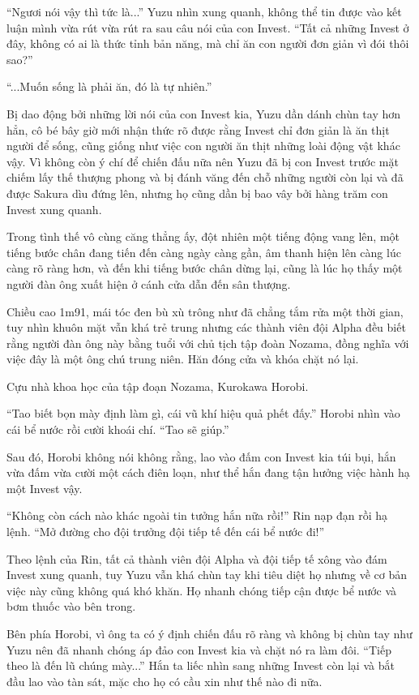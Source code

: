 {``Ngươi nói vậy thì tức là...'' Yuzu nhìn xung quanh, không thể tin được
vào kết luận mình vừa rút vừa rút ra sau câu nói của con Invest. ``Tất
cả những Invest ở đây, không có ai là thức tỉnh bản năng, mà chỉ ăn con
người đơn giản vì đói thôi sao?''

``...Muốn sống là phải ăn, đó là tự nhiên.''

Bị dao động bởi những lời nói của con Invest kia, Yuzu dần dánh chùn tay
hơn hẳn, cô bé bây giờ mới nhận thức rõ được rằng Invest chỉ đơn giản là
ăn thịt người để sống, cũng giống như việc con người ăn thịt những loài
động vật khác vậy. Vì không còn ý chí để chiến đấu nữa nên Yuzu đã bị
con Invest trước mặt chiếm lấy thế thượng phong và bị đánh văng đến chỗ
những người còn lại và đã được Sakura dìu đứng lên, nhưng họ cũng dần bị
bao vây bởi hàng trăm con Invest xung quanh.

Trong tình thế vô cùng căng thẳng ấy, đột nhiên một tiếng động vang lên,
một tiếng bước chân đang tiến đến càng ngày càng gần, âm thanh hiện lên
càng lúc càng rõ ràng hơn, và đến khi tiếng bước chân dừng lại, cũng là
lúc họ thấy một người đàn ông xuất hiện ở cánh cửa dẫn đến sân thượng.

Chiều cao 1m91, mái tóc đen bù xù trông như đã chẳng tắm rửa một thời
gian, tuy nhìn khuôn mặt vẫn khá trẻ trung nhưng các thành viên đội
Alpha đều biết rằng người đàn ông này bằng tuổi với chủ tịch tập đoàn
Nozama, đồng nghĩa với việc đây là một ông chú trung niên. Hăn đóng cửa
và khóa chặt nó lại.

Cựu nhà khoa học của tập đoạn Nozama, Kurokawa Horobi.

``Tao biết bọn mày định làm gì, cái vũ khí hiệu quả phết đấy.'' Horobi
nhìn vào cái bể nước rồi cười khoái chí. ``Tao sẽ giúp.''

Sau đó, Horobi không nói không rằng, lao vào đấm con Invest kia túi bụi,
hắn vừa đấm vừa cười một cách điên loạn, như thể hắn đang tận hưởng việc
hành hạ một Invest vậy.

``Không còn cách nào khác ngoài tin tưởng hắn nữa rồi!'' Rin nạp đạn rồi
hạ lệnh. ``Mở đường cho đội trưởng đội tiếp tế đến cái bể nước đi!''

Theo lệnh của Rin, tất cả thành viên đội Alpha và đội tiếp tế xông vào
đám Invest xung quanh, tuy Yuzu vẫn khá chùn tay khi tiêu diệt họ nhưng
về cơ bản việc này cũng không quá khó khăn. Họ nhanh chóng tiếp cận được
bể nước và bơm thuốc vào bên trong.

Bên phía Horobi, vì ông ta có ý định chiến đấu rõ ràng và không bị chùn
tay như Yuzu nên đã nhanh chóng áp đảo con Invest kia và chặt nó ra làm
đôi. ``Tiếp theo là đến lũ chúng mày...'' Hắn ta liếc nhìn sang những
Invest còn lại và bắt đầu lao vào tàn sát, mặc cho họ có cầu xin như thế
nào đi nữa.

}

